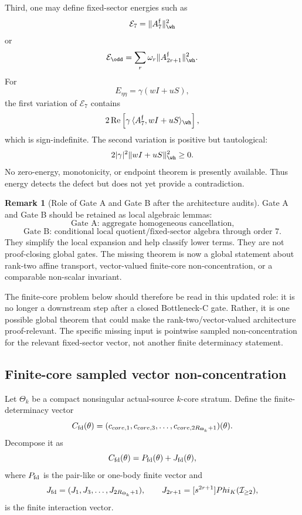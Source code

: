 \documentclass[11pt,a4paper]{amsart}
\def\Phi{Phi}%
\def\core{core}%
\theoremstyle{plain}
\theoremstyle{definition}
\newtheorem{remark}[theorem]{Remark}
\newcommand{\core}{\mathrm{core}}
\begin{document}
Third, one may define fixed-sector energies such as
\[
\mathcal E_7
=
\|A_7^{\mathfrak f}\|_{\wh}^2
\]
or
\[
\mathcal E_{\odd}
=
\sum_r \omega_r
\|A_{2r+1}^{\mathfrak f}\|_{\wh}^2.
\]
For
\[
E_{\eta\eta}
=
\gamma(wI+uS),
\]
the first variation of \(\mathcal E_7\) contains
\[
2\operatorname{Re}\left[
\gamma\,
\langle A_7^{\mathfrak f},wI+uS\rangle_{\wh}
\right],
\]
which is sign-indefinite.  The second variation is positive but tautological:
\[
2|\gamma|^2\|wI+uS\|_{\wh}^2\ge0.
\]
No zero-energy, monotonicity, or endpoint theorem is presently available.
Thus energy detects the defect but does not yet provide a contradiction.

\begin{remark}[Role of Gate A and Gate B after the architecture audits]
\label{rem:role-of-gate-a-b-after-audits}
Gate A and Gate B should be retained as local algebraic lemmas:
\[
\text{Gate A: aggregate homogeneous cancellation,}
\]
\[
\text{Gate B: conditional local quotient/fixed-sector algebra through order }7.
\]
They simplify the local expansion and help classify lower terms.  They are not
proof-closing global gates.  The missing theorem is now a global statement
about rank-two affine transport, vector-valued finite-core non-concentration,
or a comparable non-scalar invariant.
\end{remark}

The finite-core problem below should therefore be read in this updated role:
it is no longer a downstream step after a closed Bottleneck-C gate.  Rather, it
is one possible global theorem that could make the rank-two/vector-valued
architecture proof-relevant.  The specific missing input is pointwise sampled
non-concentration for the relevant fixed-sector vector, not another finite
determinacy statement.

\subsection{Finite-core sampled vector non-concentration}
\label{subsec:finite-core-sampled-vector-nonconcentration}

Let \(\Theta_k\) be a compact nonsingular actual-source \(k\)-core stratum.
Define the finite-determinacy vector
\[
C_{\rm fd}(\theta)
=
(c_{\core,1},c_{\core,3},\ldots,c_{\core,2R_{\Theta_k}+1})(\theta).
\]
Decompose it as
\[
C_{\rm fd}(\theta)=P_{\rm fd}(\theta)+J_{\rm fd}(\theta),
\]
where \(P_{\rm fd}\) is the pair-like or one-body finite vector and
\[
J_{\rm fd}
=
(J_1,J_3,\ldots,J_{2R_{\Theta_k}+1}),
\qquad
J_{2r+1}=[s^{2r+1}]\Phi_K(\mathcal I_{\ge2}),
\]
is the finite interaction vector.
\end{document}
